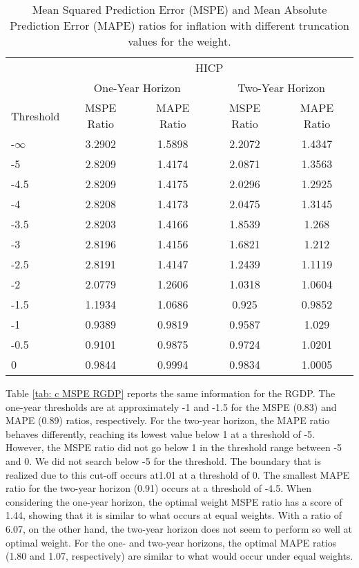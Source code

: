 \documentclass[11pt]{article}
\begin{document}
	\begin{table}[!h]
		\centering
		\caption{Mean Squared Prediction Error (MSPE) and Mean Absolute Prediction Error (MAPE) ratios for inflation with different truncation values for the weight.}
		\label{tab: c MSPE HICP}
		\begin{tabular}{lcccc}
			\hline\hline
			&                        \multicolumn{4}{c}{HICP}                         \\
			\cmidrule(lr){2-5}                              & \multicolumn{2}{c}{One-Year Horizon} & \multicolumn{2}{c}{Two-Year Horizon} \\
			\cmidrule(lr){2-3} \cmidrule(lr){4-5}
			Threshold & MSPE Ratio &    MAPE Ratio    & MSPE Ratio &    MAPE Ratio    \\ \hline
			-$\infty$ & 3.2902 & 1.5898 & 2.2072 & 1.4347\\ 
			-5 & 2.8209 & 1.4174 & 2.0871 & 1.3563\\ 
			-4.5 & 2.8209 & 1.4175 & 2.0296 & 1.2925\\ 
			-4 & 2.8208 & 1.4173 & 2.0475 & 1.3145\\ 
			-3.5 & 2.8203 & 1.4166 & 1.8539 & 1.268\\ 
			-3 & 2.8196 & 1.4156 & 1.6821 & 1.212\\ 
			-2.5 & 2.8191 & 1.4147 & 1.2439 & 1.1119\\ 
			-2 & 2.0779 & 1.2606 & 1.0318 & 1.0604\\ 
			-1.5 & 1.1934 & 1.0686 & 0.925 & 0.9852\\ 
			-1 & 0.9389 & 0.9819 & 0.9587 & 1.029\\ 
			-0.5 & 0.9101 & 0.9875 & 0.9724 & 1.0201\\ 
			0 & 0.9844 & 0.9994 & 0.9834 & 1.0005\\ 
			\hline\hline
		\end{tabular}
	\end{table}
	
	Table \ref{tab: c MSPE RGDP} reports the same information for the RGDP.  The one-year thresholds are at approximately -1 and -1.5 for the MSPE (0.83) and MAPE (0.89) ratios, respectively. For the two-year horizon, the MAPE ratio behaves differently, reaching its lowest value below 1 at a threshold of -5. However, the MSPE ratio did not go below 1 in the threshold range between -5 and 0. We did not search below -5 for the threshold. The boundary that is realized due to this cut-off occurs at1.01 at a threshold of 0. The smallest MAPE ratio for the two-year horizon (0.91) occurs at a threshold of -4.5. When considering the one-year horizon, the optimal weight MSPE ratio has a score of 1.44, showing that it is similar to what occurs at equal weights. With a ratio of 6.07, on the other hand, the two-year horizon does not seem to perform so well at optimal weight. For the one- and two-year horizons, the optimal MAPE ratios (1.80 and 1.07, respectively)  are similar to what would occur under equal weights.
	
\end{document}
